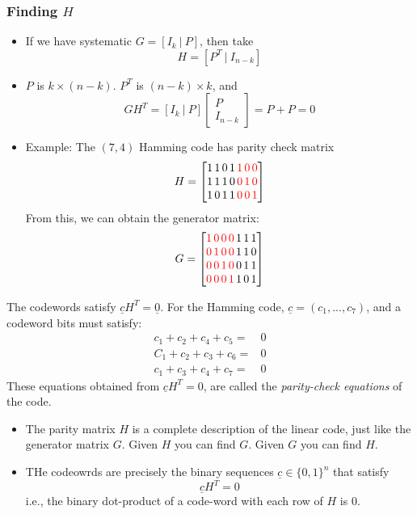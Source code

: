 \documentclass[12pt]{article}
\begin{document}
\subsubsection{Finding $H$}
\begin{itemize}
    \item If we have systematic $G = \left[ I_k \: | \: P\right]$, then take 
    \[
    H = \left[P^T \: | \: I_{n-k}\right]
    \]
    \item $P$ is $k \times (n-k)$. $P^T$ is $(n-k) \times k$, and 
    \[
    G H^T =  \left[ I_k \: | \: P\right]\begin{bmatrix}
    P\\
    I_{n-k}
    \end{bmatrix}= P + P =0
    \]
    \item Example: The $(7,4)$ Hamming code has parity check matrix
    \[
    H=
    \begin{bmatrix}
    1\,1\,0\,1\,\textcolor{red}{1\,0\,0}\\
    1\,1\,1\,0\,\textcolor{red}{0\,1\,0}\\
    1\,0\,1\,1\,\textcolor{red}{0\,0\,1}
    \end{bmatrix}
    \]
    From this, we can obtain the generator matrix:
    \[
    G=
    \begin{bmatrix}
    \textcolor{red}{1\,0\,0\,0}\, 1\,1\,1  \\
    \textcolor{red}{0\,1\,0\,0}\, 1\,1\,0  \\
    \textcolor{red}{0\,0\,1\,0}\, 0\,1\,1  \\
    \textcolor{red}{0\,0\,0\,1}\, 1\,0\,1  \\
    \end{bmatrix}
    \]
\end{itemize}
The codewords satisfy $\underline{c}H^T=\underline{0}$. For the Hamming code, $\underline{c}=(c_1,...,c_7)$, and a codeword bits must satisfy:
\begin{align*}
    c_1+c_2+c_4+c_5 =& 0\\
    C_1+c_2+c_3+c_6 =& 0\\
    c_1+c_3+c_4+c_7 =& 0
\end{align*}
These equations obtained from $\underline{c}H^T = 0$, are called the \textit{parity-check equations} of the code.
\begin{itemize}
    \item The parity matrix $H$ is a complete description of the linear code, just like the generator matrix $G$. Given $H$ you can find $G$. Given $G$ you can find $H$.
    \item THe codeowrds are precisely the binary sequences $\underline{c}\in\{0,1\}^n$ that satisfy
    \[
    \underline{c}H^T=0
    \]
    i.e., the binary dot-product of a code-word with each row of $H$ is 0.
\end{itemize}
\end{document}

